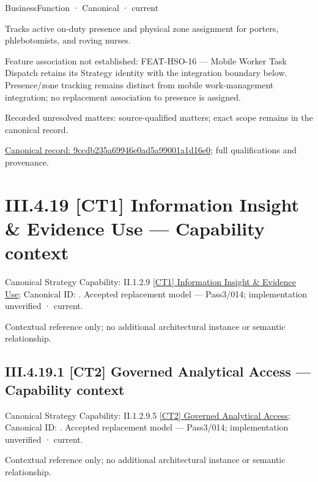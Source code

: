 \label{element:9ccdb235a69946e0ad5a99001a1d16e0}
{\small BusinessFunction · Canonical · current}\par

Tracks active on-duty presence and physical zone assignment for porters, phlebotomists, and roving nurses.



Feature association not established: FEAT-HSO-16 — Mobile Worker Task Dispatch retains its Strategy identity with the integration boundary below. Presence/zone tracking remains distinct from mobile work-management integration; no replacement association to presence is assigned.


{\small Recorded unresolved matters: source-qualified matters; exact scope remains in the canonical record.}\par
{\footnotesize \href{../../../../continuum/business/business-function/9ccdb235a69946e0ad5a99001a1d16e0.md}{Canonical record: 9ccdb235a69946e0ad5a99001a1d16e0}; full qualifications and provenance.}\par
\section*{III.4.19 [CT1] Information Insight \& Evidence Use — Capability context}
\label{navigation:III.4.19}

{\small Canonical Strategy Capability: II.1.2.9 \hyperref[element:73b06d3d6f8f4dc0a7f9f7d500c0aed4]{[CT1] Information Insight \& Evidence Use}; Canonical ID: \texttt{}. Accepted replacement model — Pass3/014; implementation unverified · current.}\par
Contextual reference only; no additional architectural instance or semantic relationship.\par
\subsection*{III.4.19.1 [CT2] Governed Analytical Access — Capability context}
\label{navigation:III.4.19.1}

{\small Canonical Strategy Capability: II.1.2.9.5 \hyperref[element:262a67d8e3fc4a4abfc5a014af89479c]{[CT2] Governed Analytical Access}; Canonical ID: \texttt{}. Accepted replacement model — Pass3/014; implementation unverified · current.}\par
Contextual reference only; no additional architectural instance or semantic relationship.\par
